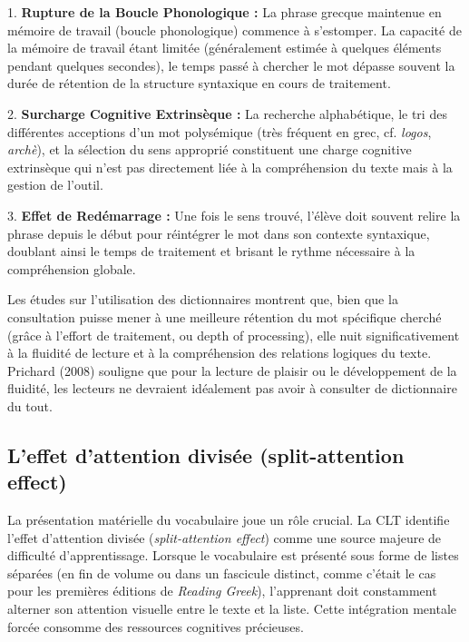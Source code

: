 {1. \textbf{Rupture de la Boucle Phonologique :} La phrase grecque maintenue en mémoire de travail
(boucle phonologique) commence à s'estomper. La capacité de la mémoire de travail étant limitée
(généralement estimée à quelques éléments pendant quelques secondes), le temps passé à chercher le
mot dépasse souvent la durée de rétention de la structure syntaxique en cours de
traitement.\cite{III-1-2-ref15}

2. \textbf{Surcharge Cognitive Extrinsèque :} La recherche alphabétique, le tri des différentes
acceptions d'un mot polysémique (très fréquent en grec, cf. \textit{logos}, \textit{archè}), et la
sélection du sens approprié constituent une charge cognitive \og extrinsèque\fg{} qui n'est pas
directement liée à la compréhension du texte mais à la gestion de l'outil.\cite{III-1-2-ref17}

3. \textbf{Effet de Redémarrage :} Une fois le sens trouvé, l'élève doit souvent relire la phrase
depuis le début pour réintégrer le mot dans son contexte syntaxique, doublant ainsi le temps de
traitement et brisant le rythme nécessaire à la compréhension globale.\cite{III-1-2-ref18}

Les études sur l'utilisation des dictionnaires montrent que, bien que la consultation puisse mener à
une meilleure rétention du mot spécifique cherché (grâce à l'effort de traitement, ou \og depth of
processing\fg{}), elle nuit significativement à la fluidité de lecture et à la compréhension des
relations logiques du texte.\cite{III-1-2-ref19} Prichard (2008) souligne que pour la lecture de
plaisir ou le développement de la fluidité, les lecteurs ne devraient idéalement pas avoir à
consulter de dictionnaire du tout.\cite{III-1-2-ref13}



\subsection{L'effet d'attention divisée (split-attention effect)}

La présentation matérielle du vocabulaire joue un rôle crucial. La CLT identifie l'effet d'attention
divisée (\textit{split-attention effect}) comme une source majeure de difficulté d'apprentissage.
Lorsque le vocabulaire est présenté sous forme de listes séparées (en fin de volume ou dans un
fascicule distinct, comme c'était le cas pour les premières éditions de \textit{Reading Greek}),
l'apprenant doit constamment alterner son attention visuelle entre le texte et la
liste.\cite{III-1-2-ref21} Cette intégration mentale forcée consomme des ressources cognitives
précieuses.

}
